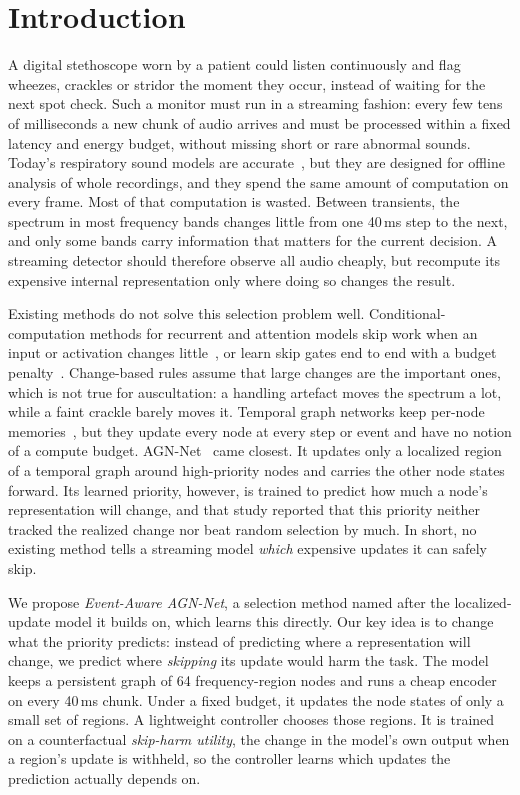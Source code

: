 \section{Introduction}
\label{sec:intro}

A digital stethoscope worn by a patient could listen continuously and flag wheezes, crackles or stridor the moment they occur, instead of waiting for the next spot check. Such a monitor must run in a streaming fashion: every few tens of milliseconds a new chunk of audio arrives and must be processed within a fixed latency and energy budget, without missing short or rare abnormal sounds. Today's respiratory sound models are accurate~\cite{bardou2018lung,petmezas2022automated,niizumi2025towards}, but they are designed for offline analysis of whole recordings, and they spend the same amount of computation on every frame. Most of that computation is wasted. Between transients, the spectrum in most frequency bands changes little from one 40\,ms step to the next, and only some bands carry information that matters for the current decision. A streaming detector should therefore observe all audio cheaply, but recompute its expensive internal representation only where doing so changes the result.

Existing methods do not solve this selection problem well. Conditional-computation methods for recurrent and attention models skip work when an input or activation changes little~\cite{neil2017delta}, or learn skip gates end to end with a budget penalty~\cite{campos2018skip,jernite2017variable,seo2018neural}. Change-based rules assume that large changes are the important ones, which is not true for auscultation: a handling artefact moves the spectrum a lot, while a faint crackle barely moves it. Temporal graph networks keep per-node memories~\cite{seo2018structured,rossi2020temporal}, but they update every node at every step or event and have no notion of a compute budget. AGN-Net~\cite{islam2026agnnet} came closest. It updates only a localized region of a temporal graph around high-priority nodes and carries the other node states forward. Its learned priority, however, is trained to predict how much a node's representation will change, and that study reported that this priority neither tracked the realized change nor beat random selection by much. In short, no existing method tells a streaming model \emph{which} expensive updates it can safely skip.

We propose \emph{Event-Aware AGN-Net}, a selection method named after the localized-update model it builds on, which learns this directly. Our key idea is to change what the priority predicts: instead of predicting where a representation will change, we predict where \emph{skipping} its update would harm the task. The model keeps a persistent graph of 64 frequency-region nodes and runs a cheap encoder on every 40\,ms chunk. Under a fixed budget, it updates the node states of only a small set of regions. A lightweight controller chooses those regions. It is trained on a counterfactual \emph{skip-harm utility}, the change in the model's own output when a region's update is withheld, so the controller learns which updates the prediction actually depends on.


